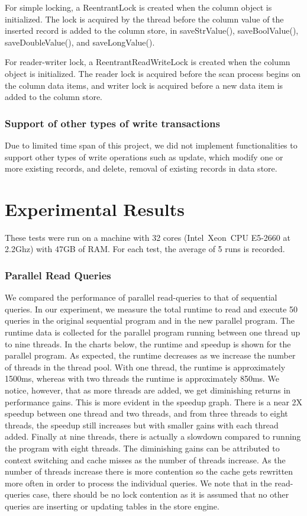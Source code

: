 \documentclass[11pt,journal,compsoc]{IEEEtran}
\begin{document}
For simple locking, a ReentrantLock is created when the column object is initialized. The lock is acquired by the thread before the column value of the inserted record is added to the column store, in saveStrValue(), saveBoolValue(), saveDoubleValue(), and saveLongValue().
 
For reader-writer lock,  a ReentrantReadWriteLock is created when the column object is initialized. The reader lock is acquired before the scan process begins on the column data items, and writer lock is acquired before a new data item is added to the column store.



\subsubsection{Support of other types of write transactions}
Due to limited time span of this project, we did not implement functionalities to support other types of write operations such as update, which modify one or more existing records, and delete, removal of existing records in data store.


\section{Experimental Results}
These tests were run on a machine with 32 cores (Intel~\texttrademark Xeon~\texttrademark CPU E5-2660 at 2.2Ghz) with 47GB of RAM. For each test, the average of 5 runs is recorded.

\subsubsection{Parallel Read Queries}
We compared the performance of parallel read-queries to that of sequential queries. In our experiment, we measure the total runtime to read and execute 50 queries in the original sequential program and in the new parallel program. The runtime data is collected for the parallel program running between one thread up to nine threads. In the charts below, the runtime and speedup is shown for the parallel program. As expected, the runtime decreases as we increase the number of threads in the thread pool. With one thread, the runtime is approximately 1500ms, whereas with two threads the runtime is approximately 850ms. We notice, however, that as more threads are added, we get diminishing returns in performance gains. This is more evident in the speedup graph. There is a near 2X speedup between one thread and two threads, and from three threads to eight threads, the speedup still increases but with smaller gains with each thread added. Finally at nine threads, there is actually a slowdown compared to running the program with eight threads. The diminishing gains can be attributed to context switching and cache misses as the number of threads increase. As the number of threads increase there is more contention so the cache gets rewritten more often in order to process the individual queries. We note that in the read-queries case, there should be no lock contention as it is assumed that no other queries are inserting or updating tables in the store engine.
\end{document}
